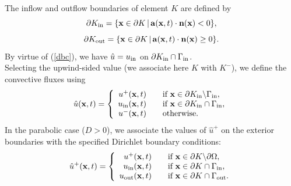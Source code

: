 \documentclass[mathserif]{beamer}
\begin{document}
\begin{frame}
The inflow and outflow boundaries of element $K$
are defined by
$$
\partial K_{\rm in}=\{\mathbf{x}\in\partial K\,|\, \mathbf{a}(\mathbf{x}, t)\cdot\mathbf{n}(\mathbf{x})<0\},$$
$$
\partial K_{\rm out}=\{\mathbf{x}\in\partial K\,|\, \mathbf{a}(\mathbf{x}, t)\cdot\mathbf{n}(\mathbf{x})\ge0\}.$$
By virtue of (\ref{dbc}), we have  $\hat u=u_{\rm in}$ on $\partial K_{\rm in}\cap \Gamma_{\rm in}$.\ \\
Selecting the upwind-sided value (we associate here $K$ with $K^-$), 
we define the convective fluxes using
\begin{equation}
\hat u(\mathbf{x},t)=\left\{\begin{array}{rl}
u^+(\mathbf{x},t)&\quad\mbox{if} \ \mathbf{x}\in\partial K_{\rm in}\backslash\Gamma_{\rm in},\\ 
u_{\rm in}(\mathbf{x},t) &\quad\mbox{if} \ \mathbf{x}\in\partial K_{\rm in}\cap\Gamma_{\rm in},\\
u^-(\mathbf{x},t)&\quad\mbox{otherwise}.
\end{array}\right.
\label{upw}
\end{equation}
In the parabolic case ($D>0$), we associate the values of $\hat u^+$ on the exterior boundaries with the specified Dirichlet boundary conditions:
\begin{equation}
\hat u^+(\mathbf{x},t)=\left\{\begin{array}{rl}
u^+(\mathbf{x},t)&\quad\mbox{if} \ \mathbf{x}\in\partial K\backslash\partial \Omega,\\ 
u_{\rm in}(\mathbf{x},t) &\quad\mbox{if} \ \mathbf{x}\in\partial K\cap\Gamma_{\rm in},\\
u_{\rm out}(\mathbf{x},t) &\quad\mbox{if} \ \mathbf{x}\in\partial K\cap\Gamma_{\rm out}.
\end{array}\right.
\label{diff}
\end{equation}

\end{frame}
\end{document}
